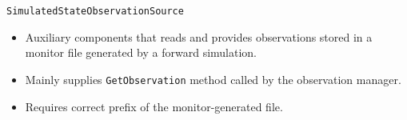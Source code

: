 \documentclass[10pt]{article}
\begin{document}
\medskip
{\large\texttt{SimulatedStateObservationSource}}
\begin{itemize}
\item Auxiliary components that reads and provides observations stored in a monitor file generated by a forward simulation.
\item Mainly supplies \texttt{GetObservation} method called by the observation manager. 
\item Requires correct prefix of the monitor-generated file. 
\end{itemize}




\end{document}
